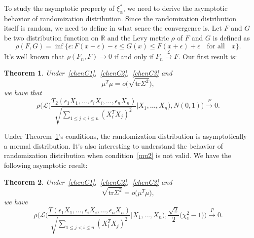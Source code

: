 \documentclass[review]{elsarticle}
\theoremstyle{plain}
\newtheorem{theorem}{\quad\quad Theorem}
\theoremstyle{definition}
\theoremstyle{remark}
\begin{document}
To study the asymptotic property of $\xi^*_{\alpha}$, we need to derive the asymptotic behavior of randomization distribution.
Since the randomization distribution itself is random, we need to define in what sence the convergence is. Let $F$ and $G$ be two distribution function on $\mathbb{R}$ and the Levy metric $\rho$ of $F$ and $G$ is defined as
\begin{equation*}
    \rho(F,G)=\inf\{\epsilon:F(x-\epsilon)-\epsilon\leq G(x)\leq F(x+\epsilon)+\epsilon\quad  \textrm{for all}\quad x\}.
\end{equation*}
It's well known that $\rho(F_n,F)\to 0$ if and only if  $F_n\xrightarrow{\mathcal{L}}F$.
Our first result is:


\begin{theorem}\label{shaziCLT}
    Under~\eqref{chenC1},~\eqref{chenC2},~\eqref{chenC3} and 
    \begin{equation}\label{mu2}
        \mu^T\mu=o\big(\sqrt{\mathrm{tr}{\Sigma}^2}\big),
    \end{equation}
    we have that
    \begin{equation*}
        \rho\Big(\mathcal{L}\Big(\frac{T_2(\epsilon_1 X_1,\ldots, \epsilon_i X_i,\ldots,\epsilon_n X_n)}{\sqrt{\sum_{1\leq j<i\leq n}{(X_i^T X_j)}^2}}\Big|X_1,\ldots,X_n\Big),N(0,1)\Big)\xrightarrow{P} 0.
    \end{equation*}
\end{theorem}
Under Theorem~\ref{shaziCLT}'s conditions, the randomization distribution is asymptotically a normal distribution. 
It's also interesting to understand the behavior of randomization distribution when condition~\eqref{mu2} is not valid. We have the following asymptotic result:

\begin{theorem}\label{farT}
    Under~\eqref{chenC1},~\eqref{chenC2},~\eqref{chenC3} and
    \begin{equation}\label{mu3}
       \sqrt{\mathrm{tr}{\Sigma}^2} =o\big(\mu^T\mu\big),
    \end{equation}
    we have
    \begin{equation}
        \rho\Big(\mathcal{L}\Big(\frac{T(\epsilon_1 X_1,\ldots, \epsilon_i X_i,\ldots,\epsilon_n X_n)}{\sqrt{\sum_{1\leq j<i\leq n}{(X_i^T X_j)}^2}}\Big|X_1,\ldots,X_n\Big),\frac{\sqrt{2}}{2}\big(\chi^2_1-1\big)\Big)\xrightarrow{P} 0.
    \end{equation}
\end{theorem}
\end{document}
